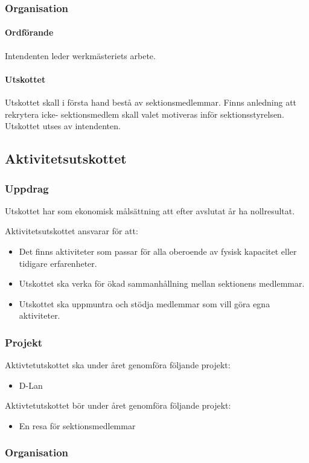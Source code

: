 \documentclass{datateknologsektionen-document}
\begin{document}
\subsubsection{Organisation}
\paragraph{Ordförande}
Intendenten leder werkmästeriets arbete.
\paragraph{Utskottet}

Utskottet skall i första hand bestå av sektionsmedlemmar. Finns anledning att rekrytera icke-
sektionsmedlem skall valet motiveras inför sektionsstyrelsen. Utskottet utses av intendenten.

\subsection{Aktivitetsutskottet}
\label{aktu}
\subsubsection{Uppdrag}
Utskottet har som ekonomisk målsättning att efter avslutat år ha nollresultat.

Aktivitetsutskottet ansvarar för att:
\begin{itemize}
  \item Det finns aktiviteter som passar för alla oberoende av fysisk kapacitet eller tidigare erfarenheter.
  \item Utskottet ska verka för ökad sammanhållning mellan sektionens medlemmar.
  \item Utskottet ska uppmuntra och stödja medlemmar som vill göra egna aktiviteter.
\end{itemize}
\subsubsection{Projekt}
Aktivtetutskottet ska under året genomföra följande projekt:
\begin{itemize}
  \item D-Lan
\end{itemize}
Aktivtetutskottet bör under året genomföra följande projekt:
\begin{itemize}
  \item En resa för sektionsmedlemmar
\end{itemize}
\subsubsection{Organisation}
\end{document}
